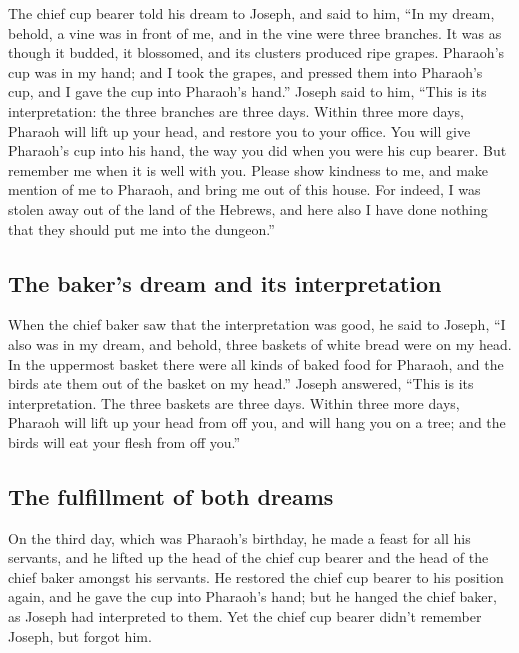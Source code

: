  The chief cup bearer told his dream to Joseph, and said
to him, ``In my dream, behold, a vine was in front of me,
 and in the vine were three branches. It was as though it
budded, it blossomed, and its clusters produced ripe grapes.
 Pharaoh's cup was in my hand; and I took the grapes, and
pressed them into Pharaoh's cup, and I gave the cup into Pharaoh's
hand.''  Joseph said to him, ``This is its
interpretation: the three branches are three days. 
Within three more days, Pharaoh will lift up your head, and restore you
to your office. You will give Pharaoh's cup into his hand, the way you
did when you were his cup bearer.  But remember me when
it is well with you. Please show kindness to me, and make mention of me
to Pharaoh, and bring me out of this house.  For indeed,
I was stolen away out of the land of the Hebrews, and here also I have
done nothing that they should put me into the dungeon.''

\hypertarget{the-bakers-dream-and-its-interpretation}{%
\subsection{The baker's dream and its
interpretation}\label{the-bakers-dream-and-its-interpretation}}

 When the chief baker saw that the interpretation was
good, he said to Joseph, ``I also was in my dream, and behold, three
baskets of white bread were on my head.  In the uppermost
basket there were all kinds of baked food for Pharaoh, and the birds ate
them out of the basket on my head.''  Joseph answered,
``This is its interpretation. The three baskets are three days.
 Within three more days, Pharaoh will lift up your head
from off you, and will hang you on a tree; and the birds will eat your
flesh from off you.''

\hypertarget{the-fulfillment-of-both-dreams}{%
\subsection{The fulfillment of both
dreams}\label{the-fulfillment-of-both-dreams}}

 On the third day, which was Pharaoh's birthday, he made
a feast for all his servants, and he lifted up the head of the chief cup
bearer and the head of the chief baker amongst his servants.
 He restored the chief cup bearer to his position again,
and he gave the cup into Pharaoh's hand;  but he hanged
the chief baker, as Joseph had interpreted to them.  Yet
the chief cup bearer didn't remember Joseph, but forgot him.

